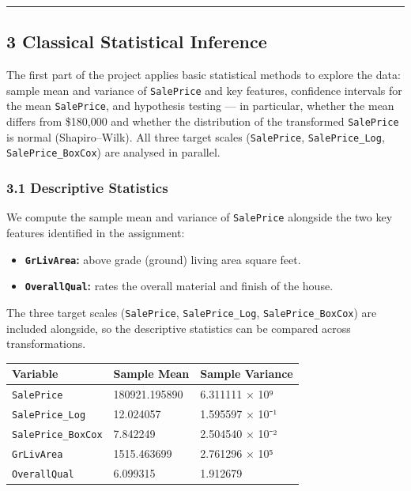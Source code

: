 \begin{center}\rule{0.5\linewidth}{0.5pt}\end{center}

\subsection{3 Classical Statistical
Inference}\label{classical-statistical-inference}

The first part of the project applies basic statistical methods to
explore the data: sample mean and variance of \texttt{SalePrice} and key
features, confidence intervals for the mean \texttt{SalePrice}, and
hypothesis testing --- in particular, whether the mean differs from
\$180,000 and whether the distribution of the transformed
\texttt{SalePrice} is normal (Shapiro--Wilk). All three target scales
(\texttt{SalePrice}, \texttt{SalePrice\_Log},
\texttt{SalePrice\_BoxCox}) are analysed in parallel.

\subsubsection{3.1 Descriptive Statistics}\label{descriptive-statistics}

We compute the sample mean and variance of \texttt{SalePrice} alongside
the two key features identified in the assignment:

\begin{itemize}
\tightlist
\item
  \textbf{\texttt{GrLivArea}:} above grade (ground) living area square
  feet.
\item
  \textbf{\texttt{OverallQual}:} rates the overall material and finish
  of the house.
\end{itemize}

The three target scales (\texttt{SalePrice}, \texttt{SalePrice\_Log},
\texttt{SalePrice\_BoxCox}) are included alongside, so the descriptive
statistics can be compared across transformations.

\begin{longtable}[]{@{}lll@{}}
\toprule\noalign{}
Variable & Sample Mean & Sample Variance \\
\midrule\noalign{}
\endhead
\bottomrule\noalign{}
\endlastfoot
\texttt{SalePrice} & 180921.195890 & 6.311111 × 10⁹ \\
\texttt{SalePrice\_Log} & 12.024057 & 1.595597 × 10⁻¹ \\
\texttt{SalePrice\_BoxCox} & 7.842249 & 2.504540 × 10⁻² \\
\texttt{GrLivArea} & 1515.463699 & 2.761296 × 10⁵ \\
\texttt{OverallQual} & 6.099315 & 1.912679 \\
\end{longtable}

